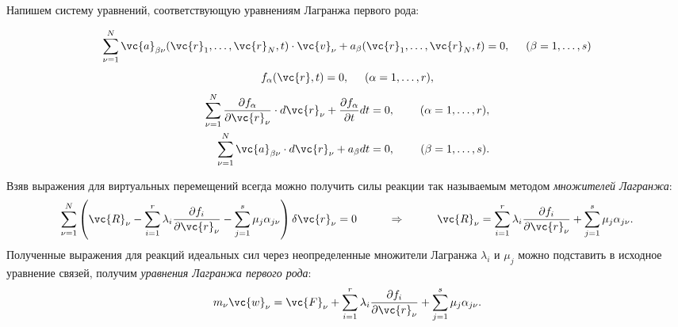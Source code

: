 Напишем систему уравнений, соответствующую уравнениям Лагранжа первого рода:

\begin{equation}
    \sum_{\nu=1}^N \vc{a}_{\beta \nu} (\vc{r}_1, \ldots, \vc{r}_N, t) \cdot \vc{v}_\nu + a_\beta  (\vc{r}_1, \ldots, \vc{r}_N, t) = 0,
    \hspace{0.5cm} (\beta = 1, \ldots, s)
\end{equation}
$$
    f_\alpha (\vc{r}, t) = 0, \hspace{0.5cm} (\alpha = 1, \ldots, r),
$$
\begin{align}
    \sum_{\nu=1}^N \frac{\partial f_\alpha}{\partial \vc{r}_\nu} \cdot d \vc{r}_\nu + \frac{\partial f_\alpha}{\partial t} d t &= 0,
    \hspace{0.5cm} &(\alpha = 1, \ldots, r), \\
    \sum_{\nu=1}^N \vc{a}_{\beta\nu} \cdot d \vc{r}_\nu + a_\beta d t &= 0,
    \hspace{0.5cm} &(\beta = 1, \ldots, s).
\end{align}



Взяв выражения для виртуальных перемещений всегда можно получить силы реакции так называемым методом \textit{множителей Лагранжа}:
\begin{equation*}
    \sum_{\nu=1}^N \left(\vc{R}_\nu - \sum_{i = 1}^r \lambda_i \frac{\partial f_i}{\partial \vc{r}_\nu} - \sum_{j = 1}^s \mu_j \alpha_{j \nu}\right) \delta \vc{r}_\nu = 0
    \hspace*{1 cm}
    \Rightarrow
    \hspace*{1 cm}
    \vc{R}_\nu = \sum_{i = 1}^r \lambda_i \frac{\partial f_i}{\partial \vc{r}_\nu} + \sum_{j = 1}^s \mu_j \alpha_{j \nu}.
\end{equation*}
Полученные выражения для реакций идеальных сил через неопределенные множители Лагранжа $\lambda_i $ и $\mu_j $ можно подставить в исходное уравнение связей, получим \textit{уравнения Лагранжа первого рода}:
\begin{equation*}
    m_\nu \vc{w}_\nu = \vc{F}_\nu + \sum_{i = 1}^r \lambda_i \frac{\partial f_i}{\partial \vc{r}_\nu} + \sum_{j = 1}^s \mu_j \alpha_{j \nu}.
\end{equation*}